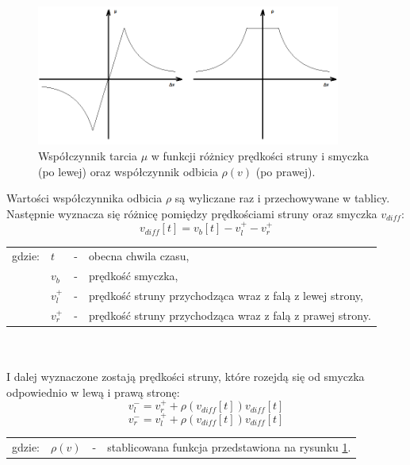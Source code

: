 \begin{figure}[H]
	\centering
	\includegraphics[width=10cm]{grafiki/tarcie2}
	\captionsetup{justification=centering}
	\caption{Współczynnik tarcia $\mu$ w funkcji różnicy prędkości struny i smyczka (po lewej) oraz współczynnik odbicia $\rho(v)$ (po prawej).}
	\label{rys:tarcie}
\end{figure}

Wartości współczynnika odbicia $\rho$ są wyliczane raz i przechowywane w tablicy. Następnie wyznacza się różnicę pomiędzy prędkościami struny oraz smyczka $v_{diff}$:
\begin{equation} \label{equ:wzor1}
v_{diff}[t] = v_b[t] - v_{l}^{+} - v_{r}^{+}
\end{equation}
\begin{tabular}{ l l l l}
	gdzie: & $t$ &  - & obecna chwila czasu, \\
	&	$v_b$ & - &  prędkość smyczka, \\
	&	$v_{l}^{+}$ & - & prędkość struny przychodząca wraz z falą z lewej strony,\\
	&	$v_{r}^{+}$ & - &  prędkość struny przychodząca wraz z falą z prawej strony.\\
\end{tabular} \\ \\
I dalej wyznaczone zostają prędkości struny, które rozejdą się od smyczka odpowiednio w lewą i prawą stronę:
\begin{equation} \label{equ:wzor2}
v_{l}^{-} = v_r^{+} +  \rho(v_{diff}[t])v_{diff}[t]
\end{equation}
\begin{equation} \label{equ:wzor3}
v_{r}^{-} = v_l^{+} +  \rho(v_{diff}[t])v_{diff}[t]
\end{equation}
\begin{tabular}{ l l l l}
	gdzie: & $\rho(v)$ &  - & stablicowana funkcja przedstawiona na rysunku \ref{rys:tarcie}. \\
	
\end{tabular}
\vspace{6pt}

